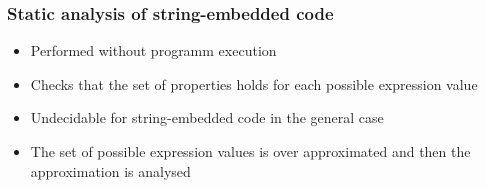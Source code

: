 \documentclass{beamer}
\begin{document}
\begin{frame}
  \transwipe[direction=90]
  \frametitle{Static analysis of string-embedded code}  
  \begin{itemize}
    \item Performed without programm execution
    \item Checks that the set of properties holds for each possible expression value
  \end{itemize}
  
  \begin{itemize}
    \item Undecidable for string-embedded code in the general case
    \item The set of possible expression values is over approximated and then 
the approximation is analysed
  \end{itemize}
\end{frame}
\end{document}
